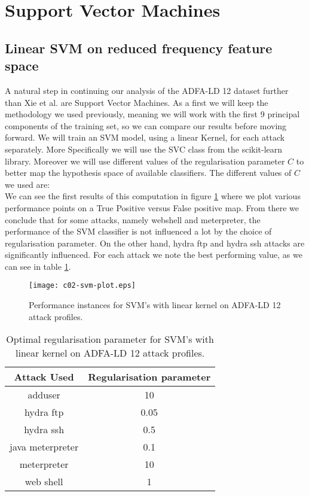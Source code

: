 \documentclass[reqno,openany,12pt]{amsbook}
\newcommand{\beqq}{\begin{equation*}}
\newcommand{\eeqq}{\end{equation*}}
\begin{document}

\section{Support Vector Machines}

\subsection{Linear SVM on reduced frequency feature space}\mbox{}


A natural step in continuing our analysis of the ADFA-LD 12 dataset further than Xie et al.\cite{adf1} are Support Vector Machines. As a first we will keep the methodology we used previously, meaning we will work with the first 9 principal components of the training set, so we can compare our results before moving forward. We will train an SVM model, using a linear Kernel, for each attack separately. More Specifically we will use the SVC class from the scikit-learn library\cite{skl}. Moreover we will use different values of the regularisation parameter $C$ to better map the hypothesis space of available classifiers. The different values of $C$ we used are: 
\beqq
[0.05, 0.1, 0.5, 1, 5, 10, 50]
\eeqq
We can see the first results of this computation in figure \ref{svm-fr1} where we plot various performance points on a True Positive versus False positive map. From there we conclude that for some attacks, namely webshell and meterpreter, the performance of the SVM classifier is not influenced a lot by the choice of  regularisation parameter. On the other hand, hydra ftp and hydra ssh attacks are significantly influenced. For each attack we note the best performing value, as we can see in table \ref{svmt1}.


\begin{figure}
\texttt{[image: c02-svm-plot.eps]}
\caption{Performance instances for SVM's with linear kernel on ADFA-LD 12 attack profiles.}
\label{svm-fr1}
\end{figure}

\begin{table}
\begin{tabular}{|c|c|}
\hline
Attack Used &  Regularisation parameter \\ \hline 
adduser          & 10 \\ \hline
hydra ftp        & 0.05 \\ \hline
hydra ssh        & 0.5 \\ \hline
java meterpreter & 0.1 \\ \hline
meterpreter      & 10 \\ \hline
web shell        & 1 \\ \hline
\end{tabular}
\vspace{5pt}
\caption{Optimal regularisation parameter for SVM's with linear kernel on ADFA-LD 12 attack profiles.}
\label{svmt1}
\end{table}
\end{document}
